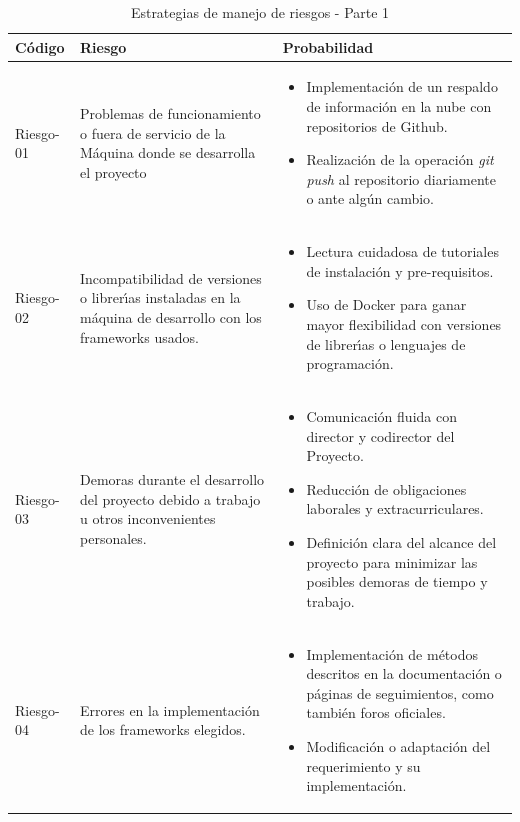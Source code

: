 \begin{table}[h!]
    \begin{tabular}{ | m{1.5cm} | m{5cm}| m{5cm} |}
        \hline
        \textbf{Código} & \textbf{Riesgo} & \textbf{Probabilidad} \\
        \hline
        Riesgo-01 & Problemas de funcionamiento o fuera de servicio de la Máquina donde se desarrolla el proyecto  & \begin{itemize}
         \item Implementación de un respaldo de información en la nube con repositorios de Github.
            \item Realización de la operación \textit{git push} al repositorio diariamente o ante algún cambio. 
             \end{itemize}\\
        \hline
         Riesgo-02 & Incompatibilidad de versiones o librerı́as instaladas en la máquina de desarrollo con los frameworks usados.&  \begin{itemize}
         \item Lectura cuidadosa de tutoriales de instalación y pre-requisitos.     
         \item Uso de Docker para ganar mayor flexibilidad con versiones de librerı́as o lenguajes de programación. 
         \end{itemize} \\
        \hline
         Riesgo-03 & Demoras durante el desarrollo del proyecto debido a trabajo u otros inconvenientes personales.    
         & \begin{itemize} 
            \item Comunicación fluida con director y codirector del Proyecto.    
            \item Reducción de obligaciones laborales y extracurriculares. 
            \item Definición clara del alcance del proyecto para minimizar las posibles demoras de tiempo y trabajo.
          \end{itemize}\\
        \hline
        Riesgo-04 & Errores en la implementación de los frameworks elegidos.  &
        \begin{itemize} 
                    \item Implementación de métodos descritos en la documentación o páginas de seguimientos, como también foros oficiales.
                    \item Modificación o adaptación del requerimiento y su implementación.
                \end{itemize}\\
        \hline
    \end{tabular}\\
    \caption{Estrategias de manejo de riesgos - Parte 1}
    \label{manejoriesgos1}
\end{table}


